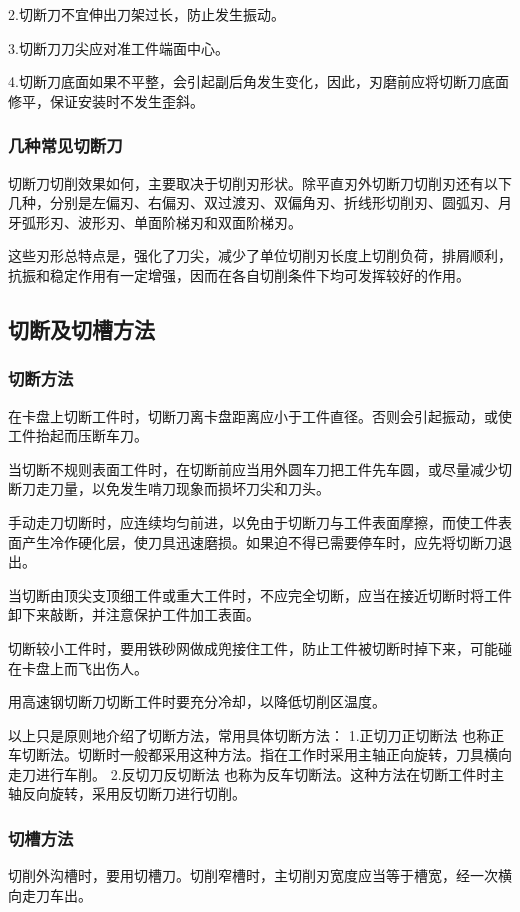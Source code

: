 \documentclass{ctexbook}
\begin{document}
2.切断刀不宜伸出刀架过长，防止发生振动。

3.切断刀刀尖应对准工件端面中心。

4.切断刀底面如果不平整，会引起副后角发生变化，因此，刃磨前应将切断刀底面修平，保证安装时不发生歪斜。
\subsubsection{几种常见切断刀}
切断刀切削效果如何，主要取决于切削刃形状。除平直刃外切断刀切削刃还有以下几种，分别是左偏刃、右偏刃、双过渡刃、双偏角刃、折线形切削刃、圆弧刃、月牙弧形刃、波形刃、单面阶梯刃和双面阶梯刃。

这些刃形总特点是，强化了刀尖，减少了单位切削刃长度上切削负荷，排屑顺利，抗振和稳定作用有一定增强，因而在各自切削条件下均可发挥较好的作用。
\subsection{切断及切槽方法}
\subsubsection{切断方法}
在卡盘上切断工件时，切断刀离卡盘距离应小于工件直径。否则会引起振动，或使工件抬起而压断车刀。

当切断不规则表面工件时，在切断前应当用外圆车刀把工件先车圆，或尽量减少切断刀走刀量，以免发生啃刀现象而损坏刀尖和刀头。

手动走刀切断时，应连续均匀前进，以免由于切断刀与工件表面摩擦，而使工件表面产生冷作硬化层，使刀具迅速磨损。如果迫不得已需要停车时，应先将切断刀退出。

当切断由顶尖支顶细工件或重大工件时，不应完全切断，应当在接近切断时将工件卸下来敲断，并注意保护工件加工表面。

切断较小工件时，要用铁砂网做成兜接住工件，防止工件被切断时掉下来，可能碰在卡盘上而飞出伤人。

用高速钢切断刀切断工件时要充分冷却，以降低切削区温度。

以上只是原则地介绍了切断方法，常用具体切断方法：
1.正切刀正切断法 也称正车切断法。切断时一般都采用这种方法。指在工作时采用主轴正向旋转，刀具横向走刀进行车削。
2.反切刀反切断法 也称为反车切断法。这种方法在切断工件时主轴反向旋转，采用反切断刀进行切削。
\subsubsection{切槽方法}
切削外沟槽时，要用切槽刀。切削窄槽时，主切削刃宽度应当等于槽宽，经一次横向走刀车出。
\end{document}
